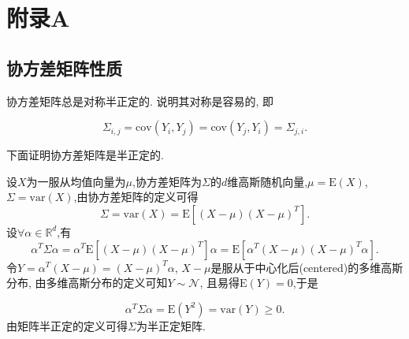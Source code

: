 \titleformat{\section}{\sanhao\bfseries\centering}{\thescetion}{1em}{}
\setcounter{subsection}{0}
\setcounter{equation}{0}

\section*{附录\quad A} %

\setcounter{section}{10} %
\renewcommand\thesection{A}

    \subsection{协方差矩阵性质} \label{A.1}

        协方差矩阵总是对称半正定的. 说明其对称是容易的, 即

        \begin{equation}
            \Sigma_{i,j}=\mathrm{cov}(Y_{i},Y_{j})=\mathrm{cov}(Y_{j},Y_{i})=\Sigma_{j,i}.
        \end{equation}

        下面证明协方差矩阵是半正定的.
        \begin{pf}
            设$X$为一服从均值向量为$\mu$,协方差矩阵为$\Sigma$的$d$维高斯随机向量,$\mu=\mathrm{E}(X)$,$\Sigma=\mathrm{var}(X)$,由协方差矩阵的定义可得
            \begin{equation}
                \Sigma=\mathrm{var}(X)=\mathrm{E}[(X-\mu)(X-\mu)^{T}].
            \end{equation}
            设$\forall\alpha\in\mathds{R}^{d}$,有
            \begin{equation}
                \alpha^{T}\Sigma\alpha=\alpha^{T}\mathrm{E}[(X-\mu)(X-\mu)^{T}]\alpha=\mathrm{E}[\alpha^{T}(X-\mu)(X-\mu)^{T}\alpha].
            \end{equation}
            令$Y=\alpha^{T}(X-\mu)=(X-\mu)^{T}\alpha$, $X-\mu$是服从于中心化后(centered)的多维高斯分布, 由多维高斯分布的定义可知$Y\sim\mathcal{N}$, 且易得$\mathrm{E}(Y)=0$,于是

            \begin{equation}
                \alpha^{T}\Sigma\alpha=\mathrm{E}(Y^{2})=\mathrm{var}(Y)\geqslant 0.
            \end{equation}
            由矩阵半正定的定义可得$\Sigma$为半正定矩阵.
        \end{pf}

